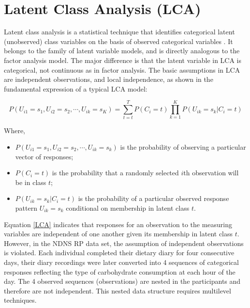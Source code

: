 \section{Latent Class Analysis (LCA)}\vspace{-0.3cm}

Latent class analysis is a statistical technique that identifies categorical latent (unobserved) class variables on the basis of observed categorical variables \parencite{collins2010latent}. It belongs to the family of latent variable models, and is directly analogous to the factor analysis model. The major difference is that the latent variable in LCA is categorical, not continuous as in factor analysis. The basic assumptions in LCA are independent observations, and local independence, as shown in the fundamental expression of a typical LCA model: \vspace{-0.8cm}

\begin{equation}
P(U_{i1} = s_1, U_{i2} = s_2, \cdots, U_{ik} = s_K) = \sum_{t=t}^{T}P(C_i = t)\prod_{k = 1}^{K}P(U_{ik} = s_k | C_i = t)
\label{LCA}
\end{equation}\vspace{-0.7cm}

Where, 

\begin{itemize}
	\item $P(U_{i1} = s_1, U_{i2} = s_2, \cdots, U_{ik} = s_k)$ is the probability of observing a particular vector of responses;
	\item $P(C_i = t)$ is the probability that a randomly selected $i$th observation will be in class $t$;
	\item $P(U_{ik} = s_k | C_i = t)$ is the probability of a particular observed response pattern $U_{ik} = s_k$ conditional on membership in latent class $t$.
\end{itemize}


Equation \ref{LCA} indicates that responses for an observation to the measuring variables are independent of one another given its membership in latent class $t$. However, in the NDNS RP data set, the assumption of independent observations is violated. Each individual completed their dietary diary for four consecutive days, their diary recordings were later converted into 4 sequences of categorical responses reflecting the type of carbohydrate consumption at each hour of the day. The 4 observed sequences (observations) are nested in the participants and therefore are not independent. This nested data structure requires multilevel techniques. 
\vspace{-0.3cm}

